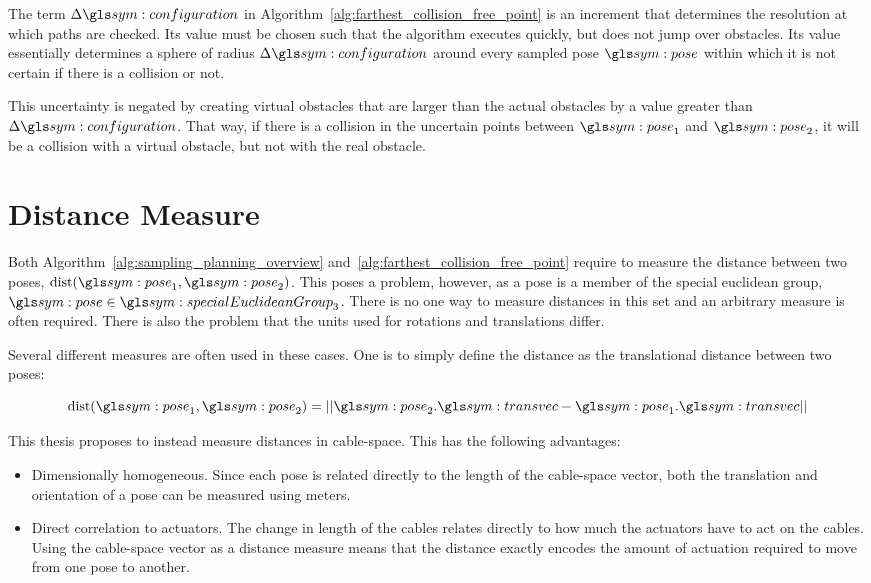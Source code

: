 		The term $\Delta\configuration$ in
		Algorithm~\ref{alg:farthest_collision_free_point} is an increment that
		determines the resolution at which paths are checked. Its value must be
		chosen such that the algorithm executes quickly, but does not jump over
		obstacles. Its value essentially determines a sphere of radius
		$\Delta\configuration$ around every sampled pose $\pose$ within which it
		is not certain if there is a collision or not.

		This uncertainty is negated by creating virtual obstacles that are
		larger than the actual obstacles by a value
		greater than $\Delta\configuration$. That way, if there is a collision
		in the uncertain points between $\pose_1$ and $\pose_2$, it will be a
		collision with a virtual obstacle, but not with the real obstacle.

	\section{Distance Measure}%
	\label{sec:distance_measure}

		Both Algorithm~\ref{alg:sampling_planning_overview}
		and~\ref{alg:farthest_collision_free_point} require to measure the
		distance between two poses, $\dist(\pose_1, \pose_2)$. This poses a
		problem, however, as a pose is a member of the special euclidean group,
		$\pose \in \specialEuclideanGroup{3}$. There is no one way to measure
		distances in this set and an arbitrary measure is often required. There
		is also the problem that the units used for rotations and translations
		differ.

		Several different measures are often used in these cases. One is to
		simply define the distance as the translational distance between two
		poses:

		\begin{equation}
			\dist(\pose_1, \pose_2) =
				\norm{%
					\pose_2.\transvec - \pose_1.\transvec
				}
			\label{eq:euclidean_distance}
		\end{equation}


		This thesis proposes to instead measure distances in cable-space. This
		has the following advantages:

		\begin{itemize}

			\item

				Dimensionally homogeneous. Since each pose is related directly
				to the length of the cable-space vector, both the translation
				and orientation of a pose can be measured using meters.

			\item

				Direct correlation to actuators. The change in length of the
				cables relates directly to how much the actuators have to act on
				the cables. Using the cable-space vector as a distance measure
				means that the distance exactly encodes the amount of actuation
				required to move from one pose to another.

		\end{itemize}

